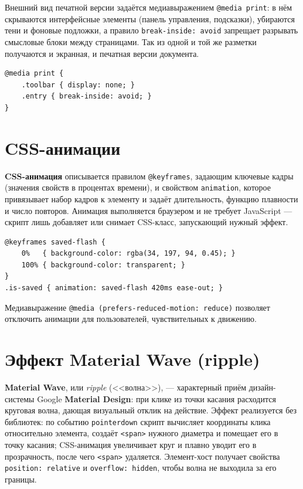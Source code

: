 Внешний вид печатной версии задаётся медиавыражением \texttt{@media print}:
в нём скрываются интерфейсные элементы (панель управления, подсказки),
убираются тени и фоновые подложки, а правило \texttt{break-inside:~avoid}
запрещает разрывать смысловые блоки между страницами. Так из одной и той же
разметки получаются и экранная, и печатная версии документа.

\begin{lstlisting}[caption={Правила только для печати},captionpos=b]
@media print {
    .toolbar { display: none; }
    .entry { break-inside: avoid; }
}
\end{lstlisting}

\section{CSS-анимации}

\textbf{CSS-анимация} описывается правилом \texttt{@keyframes}, задающим
ключевые кадры (значения свойств в процентах времени), и свойством
\texttt{animation}, которое привязывает набор кадров к элементу и задаёт
длительность, функцию плавности и число повторов. Анимация выполняется
браузером и не требует JavaScript --- скрипт лишь добавляет или снимает
CSS-класс, запускающий нужный эффект.

\begin{lstlisting}[caption={Описание и применение анимации},captionpos=b]
@keyframes saved-flash {
    0%   { background-color: rgba(34, 197, 94, 0.45); }
    100% { background-color: transparent; }
}
.is-saved { animation: saved-flash 420ms ease-out; }
\end{lstlisting}

Медиавыражение \texttt{@media (prefers-reduced-motion: reduce)} позволяет
отключить анимации для пользователей, чувствительных к движению.

\section{Эффект Material Wave (ripple)}

\textbf{Material Wave}, или \textit{ripple} (<<волна>>), --- характерный
приём дизайн-системы Google \textbf{Material Design}: при клике из точки
касания расходится круговая волна, дающая визуальный отклик на действие.
Эффект реализуется без библиотек: по событию \texttt{pointerdown} скрипт
вычисляет координаты клика относительно элемента, создаёт \texttt{<span>}
нужного диаметра и помещает его в точку касания; CSS-анимация увеличивает
круг и плавно уводит его в прозрачность, после чего \texttt{<span>}
удаляется. Элемент-хост получает свойства \texttt{position:~relative} и
\texttt{overflow:~hidden}, чтобы волна не выходила за его границы.

\endinput
